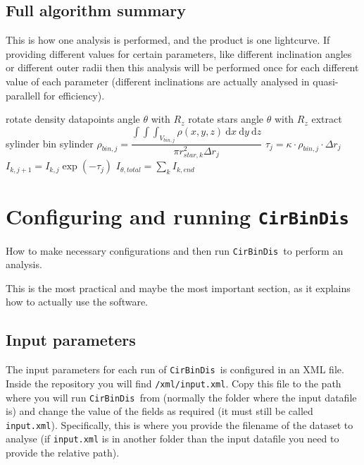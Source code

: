 \documentclass[a4paper, 12pt, english, titlepage]{article}
\newcommand{\D}[1]{\ \mathrm{d}#1} %
\newcommand{\sname}{\texttt{CirBinDis }}
\begin{document}
\subsection{Full algorithm summary}
    This is how one analysis is performed, and the product is one lightcurve. If providing different values for certain parameters, like different inclination angles or different outer radii then this analysis will be performed once for each different value of each parameter (different inclinations are actually analysed in quasi-parallell for efficiency).
    \begin{algorithmic}
            \STATE rotate density datapoints angle $\theta$ with $R_z$
            \STATE rotate stars angle $\theta$ with $R_z$
                \STATE extract sylinder
                \STATE bin sylinder
                    \STATE $\rho_{bin,j} =
                        \dfrac{\int\int\int_{V_{bin,j}} \rho(x,y,z) \D{x}\D{y}\D{z}}
                        {\pi r_{star,k}^2 \Delta r_j}$
                    \STATE $\tau_j = \kappa \cdot \rho_{bin,j} \cdot \Delta r_j$
                    \STATE $I_{k,j+1} = I_{k,j} \exp(-\tau_j)$
                \ENDFOR
            \ENDFOR
            \STATE $I_{\theta,total} = \sum_k I_{k,end}$
        \ENDFOR
    \end{algorithmic}




\section{Configuring and running \sname}

How to make necessary configurations and then run \sname to perform an analysis.

This is the most practical and maybe the most important section, as it explains how to actually use the software.

\subsection{Input parameters}
    The input parameters for each run of \sname is configured in an XML file. Inside the repository you will find \texttt{/xml/input.xml}. Copy this file to the path where you will run \sname from (normally the folder where the input datafile is) and change the value of the fields as required (it must still be called \texttt{input.xml}). Specifically, this is where you provide the filename of the dataset to analyse (if \texttt{input.xml} is in another folder than the input datafile you need to provide the relative path).
\end{document}

